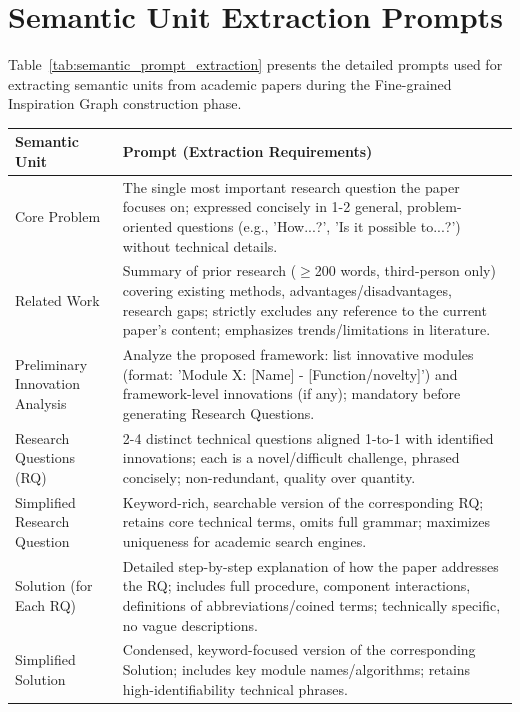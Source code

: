 \documentclass[runningheads]{llncs}
\begin{document}
\section{Semantic Unit Extraction Prompts}
\label{app:semantic_prompts}

Table~\ref{tab:semantic_prompt_extraction} presents the detailed prompts used for extracting semantic units from academic papers during the Fine-grained Inspiration Graph construction phase.

\begin{table}[h]
\centering
\setlength\tabcolsep{6pt}
\renewcommand{\arraystretch}{1.4}
\small
\begin{tabular}{p{3.5cm}p{9.5cm}}
\toprule
\textbf{Semantic Unit} & \textbf{Prompt (Extraction Requirements)} \\
\midrule
Core Problem & The single most important research question the paper focuses on; expressed concisely in 1-2 general, problem-oriented questions (e.g., 'How...?', 'Is it possible to...?') without technical details. \\
\midrule
Related Work & Summary of prior research ($\geq$200 words, third-person only) covering existing methods, advantages/disadvantages, research gaps; strictly excludes any reference to the current paper's content; emphasizes trends/limitations in literature. \\
\midrule
Preliminary Innovation Analysis & Analyze the proposed framework: list innovative modules (format: 'Module X: [Name] - [Function/novelty]') and framework-level innovations (if any); mandatory before generating Research Questions. \\
\midrule
Research Questions (RQ) & 2-4 distinct technical questions aligned 1-to-1 with identified innovations; each is a novel/difficult challenge, phrased concisely; non-redundant, quality over quantity. \\
\midrule
Simplified Research Question & Keyword-rich, searchable version of the corresponding RQ; retains core technical terms, omits full grammar; maximizes uniqueness for academic search engines. \\
\midrule
Solution (for Each RQ) & Detailed step-by-step explanation of how the paper addresses the RQ; includes full procedure, component interactions, definitions of abbreviations/coined terms; technically specific, no vague descriptions. \\
\midrule
Simplified Solution & Condensed, keyword-focused version of the corresponding Solution; includes key module names/algorithms; retains high-identifiability technical phrases. \\

\end{tabular}
\end{table}
\end{document}
